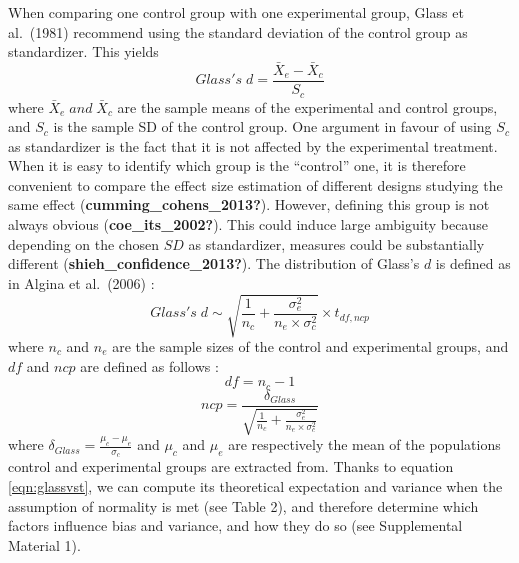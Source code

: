 \documentclass[
  english,
  man]{apa6}
\begin{document}
When comparing one control group with one experimental group, Glass et al.~(1981) recommend using the standard deviation of the control group as standardizer. This yields
\begin{equation*} 
Glass's \; d = \frac{\bar{X}_{e} - \bar{X}_{c}}{S_{c}}
\label{eqn:Glassds}
\end{equation*}
where \(\bar{X}_{e} \; and \; \bar{X}_{c}\) are the sample means of the experimental and control groups, and \(S_{c}\) is the sample SD of the control group. One argument in favour of using \(S_c\) as standardizer is the fact that it is not affected by the experimental treatment. When it is easy to identify which group is the ``control'' one, it is therefore convenient to compare the effect size estimation of different designs studying the same effect (\textbf{cumming\_cohens\_2013?}). However, defining this group is not always obvious (\textbf{coe\_its\_2002?}). This could induce large ambiguity because depending on the chosen \(SD\) as standardizer, measures could be substantially different (\textbf{shieh\_confidence\_2013?}). The distribution of Glass's \(d\) is defined as in Algina et al.~(2006) :
\begin{equation} 
Glass's \; d \sim \sqrt{\frac{1}{n_{c}}+\frac{\sigma_{e}^2}{n_{e} \times \sigma^2_{c}}} \times t_{df,ncp}
\label{eqn:glassvst}
\end{equation}
where \(n_c\) and \(n_e\) are the sample sizes of the control and experimental groups, and \(df\) and \(ncp\) are defined as follows :
\begin{equation} 
df = n_{c}-1
\label{eqn:glassdf}
\end{equation}
\begin{equation*} 
ncp = \frac{\delta_{Glass}}{\sqrt{\frac{1}{n_{c}} + \frac{\sigma_{e}^2}{n_{e} \times \sigma^2_{c}}}}
\label{eqn:glassncp}
\end{equation*}
where \(\delta_{Glass} = \frac{\mu_{c}-\mu_{e}}{\sigma_{c}}\) and \(\mu_c\) and \(\mu_e\) are respectively the mean of the populations control and experimental groups are extracted from. Thanks to equation \ref{eqn:glassvst}, we can compute its theoretical expectation and variance when the assumption of normality is met (see Table 2), and therefore determine which factors influence bias and variance, and how they do so (see Supplemental Material 1).

\newpage
\blandscape
\end{document}
